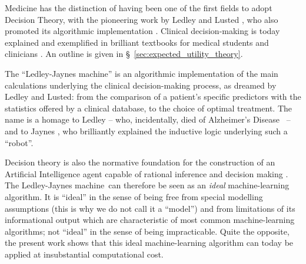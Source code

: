 \documentclass[utf8]{FrontiersinHarvard} %
\newcommand*{\sect}{\S}%
\newcommand*{\chaps}{chs}%
\renewcommand*{\|}[1][]{\nonscript\:#1\vert\nonscript\:\mathopen{}}
\newcommand*{\ad}{Alzheimer's Disease}
\newcommand*{\ljm}{Ledley-Jaynes machine}
\begin{document}
Medicine has the distinction of having been one of the first fields to adopt Decision Theory, with the pioneering work by Ledley and Lusted \citep{ledleyetal1959,ledleyetal1959b,ledleyetal1960,lustedetal1960}, who also promoted its algorithmic implementation \citep[see especially \sect~1-5 p.~21]{ledley1959,ledley1960}. Clinical decision-making is today explained and exemplified in brilliant textbooks for medical students and clinicians \citep{weinsteinetal1980,soxetal1988_r2013,huninketal2001_r2014}. An outline is given in \sect~\ref{sec:expected_utility_theory}.

The \enquote{\ljm} is an algorithmic implementation of the main calculations underlying the clinical decision-making process, as dreamed by Ledley and Lusted: from the comparison of a patient's specific predictors with the statistics offered by a clinical database, to the choice of optimal treatment. The name is a homage to Ledley -- who, incidentally, died of \ad\ \citep{shahetal2013} -- and to Jaynes \citeyearpar{jaynes1994_r2003}, who brilliantly explained the inductive logic underlying such a \enquote{robot}.


Decision theory is also the normative foundation for the construction of an Artificial Intelligence agent capable of rational inference and decision making \citetext{\citealt[part~IV]{russelletal1995_r2022}; \citealt[\chaps~1--2, 13--14]{jaynes1994_r2003}}. The \ljm\ can therefore be seen as an \emph{ideal} machine-learning algorithm. It is \enquote{ideal} in the sense of being free from special modelling assumptions (this is why we do not call it a \enquote{model}) and from limitations of its informational output which are characteristic of most common machine-learning algorithms; not \enquote{ideal} in the sense of being impracticable. Quite the opposite, the present work shows that this ideal machine-learning algorithm can today be applied at insubstantial computational cost. %
\end{document}
